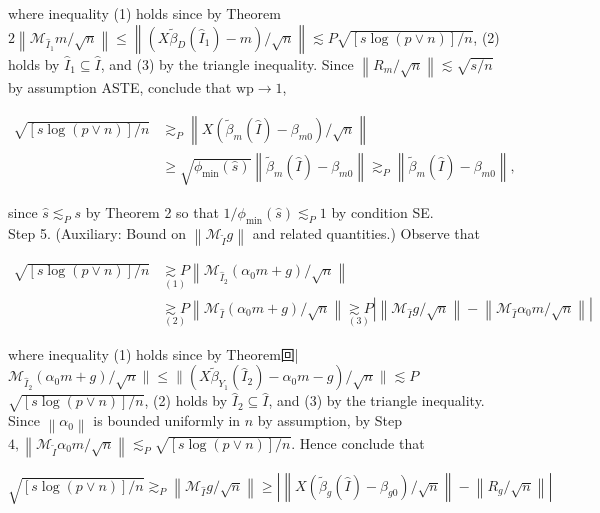 \documentclass[10pt]{article}
\begin{document}
where inequality (1) holds since by Theorem \(2\left\|\mathcal{M}_{\widehat{I}_{1}} m / \sqrt{n}\right\| \leqslant\left\|\left(X \tilde{\beta}_{D}\left(\widehat{I}_{1}\right)-m\right) / \sqrt{n}\right\| \lesssim P \sqrt{[s \log (p \vee n)] / n}\), (2) holds by \(\widehat{I}_{1} \subseteq \widehat{I}\), and (3) by the triangle inequality. Since \(\left\|R_{m} / \sqrt{n}\right\| \lesssim \sqrt{s / n}\) by assumption ASTE, conclude that \(\mathrm{wp} \rightarrow 1\),

\[
\begin{aligned}
\sqrt{[s \log (p \vee n)] / n} & \gtrsim_{P}\left\|X\left(\tilde{\beta}_{m}(\widehat{I})-\beta_{m 0}\right) / \sqrt{n}\right\| \\
& \geqslant \sqrt{\phi_{\min }(\widehat{s})}\left\|\tilde{\beta}_{m}(\widehat{I})-\beta_{m 0}\right\| \gtrsim_{P}\left\|\tilde{\beta}_{m}(\widehat{I})-\beta_{m 0}\right\|,
\end{aligned}
\]

since \(\widehat{s} \lesssim_{P} s\) by Theorem 2 so that \(1 / \phi_{\min }(\widehat{s}) \lesssim_{P} 1\) by condition SE.\\
Step 5. (Auxiliary: Bound on \(\left\|\mathcal{M}_{\tilde{I}} g\right\|\) and related quantities.) Observe that

\[
\begin{aligned}
\sqrt{[s \log (p \vee n)] / n} & \underset{(1)}{\gtrsim P}\left\|\mathcal{M}_{\widehat{I}_{2}}\left(\alpha_{0} m+g\right) / \sqrt{n}\right\| \\
& \underset{(2)}{\gtrsim P}\left\|\mathcal{M}_{\widehat{I}}\left(\alpha_{0} m+g\right) / \sqrt{n}\right\| \underset{(3)}{\gtrsim P}\left|\left\|\mathcal{M}_{\widehat{I}} g / \sqrt{n}\right\|-\left\|\mathcal{M}_{\widehat{I}} \alpha_{0} m / \sqrt{n}\right\|\right|
\end{aligned}
\]

where inequality (1) holds since by Theorem回| \(\mathcal{M}_{\widehat{I}_{2}}\left(\alpha_{0} m+g\right) / \sqrt{n}\|\leqslant\|\left(X \tilde{\beta}_{Y_{1}}\left(\widehat{I}_{2}\right)-\alpha_{0} m-g\right) / \sqrt{n} \| \lesssim P\) \(\sqrt{[s \log (p \vee n)] / n}\), (2) holds by \(\widehat{I}_{2} \subseteq \widehat{I}\), and (3) by the triangle inequality. Since \(\left\|\alpha_{0}\right\|\) is bounded uniformly in \(n\) by assumption, by Step \(4,\left\|\mathcal{M}_{\tilde{I}} \alpha_{0} m / \sqrt{n}\right\| \lesssim_{P} \sqrt{[s \log (p \vee n)] / n}\). Hence conclude that

\[
\sqrt{[s \log (p \vee n)] / n} \gtrsim_{P}\left\|\mathcal{M}_{\widehat{I}} g / \sqrt{n}\right\| \geqslant\left|\left\|X\left(\tilde{\beta}_{g}(\widehat{I})-\beta_{g 0}\right) / \sqrt{n}\right\|-\left\|R_{g} / \sqrt{n}\right\|\right|
\]
\end{document}
